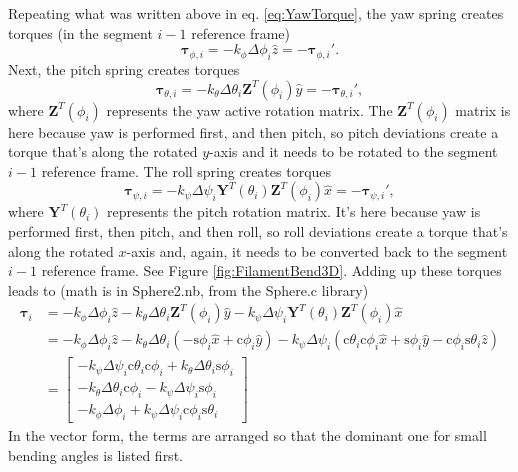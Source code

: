 \documentclass {scrbook}
\begin{document}
Repeating what was written above in eq. \ref{eq:YawTorque}, the yaw spring creates torques (in the segment $i-1$ reference frame)
$$\bm{\tau}_{\phi,i} = - k_\phi \Delta \phi_i \hat{z} = -\bm{\tau}_{\phi,i}'.$$
Next, the pitch spring creates torques
\begin{equation}
\bm{\tau}_{\theta,i} = - k_\theta \Delta \theta_i \bm{Z}^T(\phi_i) \hat{y} = -\bm{\tau}_{\theta,i}',
\label{eq:PitchTorque}
\end{equation}
where $\bm{Z}^T(\phi_i)$ represents the yaw active rotation matrix. The $\bm{Z}^T(\phi_i)$ matrix is here because yaw is performed first, and then pitch, so pitch deviations create a torque that's along the rotated $y$-axis and it needs to be rotated to the segment $i-1$ reference frame. The roll spring creates torques
\begin{equation}
\bm{\tau}_{\psi,i} = - k_\psi \Delta \psi_i \bm{Y}^T(\theta_i) \bm{Z}^T(\phi_i) \hat{x} = -\bm{\tau}_{\psi,i}',
\label{eq:RollTorque}
\end{equation}
where $\bm{Y}^T(\theta_i)$ represents the pitch rotation matrix. It's here because yaw is performed first, then pitch, and then roll, so roll deviations create a torque that's along the rotated $x$-axis and, again, it needs to be converted back to the segment $i-1$ reference frame. See Figure \ref{fig:FilamentBend3D}. Adding up these torques leads to (math is in Sphere2.nb, from the Sphere.c library)
\begin{align}
\bm{\tau}_i &= - k_\phi \Delta \phi_i \hat{z} - k_\theta \Delta \theta_i \bm{Z}^T(\phi_i) \hat{y} - k_\psi \Delta \psi_i \bm{Y}^T(\theta_i) \bm{Z}^T(\phi_i) \hat{x} \nonumber \\
&= - k_\phi \Delta \phi_i \hat{z} - k_\theta \Delta \theta_i (-\textrm{s}\phi_i \hat{x} + \textrm{c}\phi_i \hat{y}) - k_\psi \Delta \psi_i (\textrm{c} \theta_i \textrm{c} \phi_i \hat{x} + \textrm{s} \phi_i \hat{y} - \textrm{c}\phi_i \textrm{s} \theta_i \hat{z}) \nonumber \\
&= \left[ \begin{array}{c} - k_\psi \Delta \psi_i \textrm{c} \theta_i \textrm{c} \phi_i + k_\theta \Delta \theta_i \textrm{s}\phi_i \\ -k_\theta \Delta \theta_i \textrm{c}\phi_i - k_\psi \Delta \psi_i \textrm{s} \phi_i \\ - k_\phi \Delta \phi_i + k_\psi \Delta \psi_i \textrm{c}\phi_i \textrm{s} \theta_i \end{array} \right]
\label{eq:BendTorque}
\end{align}
In the vector form, the terms are arranged so that the dominant one for small bending angles is listed first.
\end{document}
